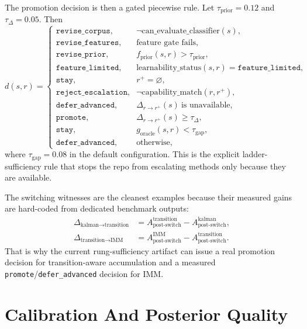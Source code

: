 \documentclass[11pt]{article}
\begin{document}
The promotion decision is then a gated piecewise rule. Let
\(\tau_{\text{prior}} = 0.12\) and \(\tau_{\Delta} = 0.05\). Then
\begin{equation}
    d(s,r)
    =
    \begin{cases}
        \texttt{revise\_corpus}, & \neg \text{can\_evaluate\_classifier}(s), \\
        \texttt{revise\_features}, & \text{feature gate fails}, \\
        \texttt{revise\_prior}, & f_{\text{prior}}(s,r) > \tau_{\text{prior}}, \\
        \texttt{feature\_limited}, & \text{learnability\_status}(s,r)=\texttt{feature\_limited}, \\
        \texttt{stay}, & r^{+} = \varnothing, \\
        \texttt{reject\_escalation}, & \neg \text{capability\_match}(r,r^{+}), \\
        \texttt{defer\_advanced}, & \Delta_{r \rightarrow r^{+}}(s)\ \text{is unavailable}, \\
        \texttt{promote}, & \Delta_{r \rightarrow r^{+}}(s) \ge \tau_{\Delta}, \\
        \texttt{stay}, & g_{\text{oracle}}(s,r) < \tau_{\text{gap}}, \\
        \texttt{defer\_advanced}, & \text{otherwise},
    \end{cases}
\end{equation}
where \(\tau_{\text{gap}} = 0.08\) in the default configuration. This is the
explicit ladder-sufficiency rule that stops the repo from escalating methods
only because they are available.

The switching witnesses are the cleanest examples because their measured gains
are hard-coded from dedicated benchmark outputs:
\begin{align}
    \Delta_{\text{kalman} \rightarrow \text{transition}}
    &=
    A_{\text{post-switch}}^{\text{transition}}
    -
    A_{\text{post-switch}}^{\text{kalman}}, \\
    \Delta_{\text{transition} \rightarrow \text{IMM}}
    &=
    A_{\text{post-switch}}^{\text{IMM}}
    -
    A_{\text{post-switch}}^{\text{transition}}.
\end{align}
That is why the current rung-sufficiency artifact can issue a real promotion
decision for transition-aware accumulation and a measured
\texttt{promote}/\texttt{defer\_advanced} decision for IMM.

\section{Calibration And Posterior Quality}
\end{document}
